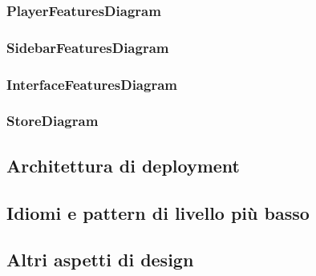 	


\subsubsection{PlayerFeaturesDiagram}


\subsubsection{SidebarFeaturesDiagram}


\subsubsection{InterfaceFeaturesDiagram}


\subsubsection{StoreDiagram}


\subsection{Architettura di deployment}
\subsection{Idiomi e pattern di livello più basso}
\subsection{Altri aspetti di design}
























